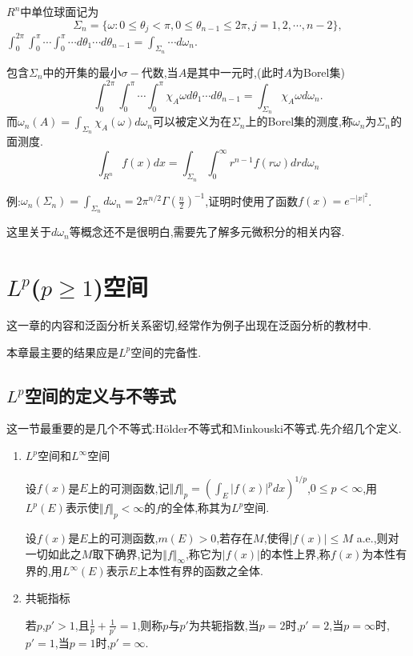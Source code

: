 \documentclass[12pt,a4paper,openany]{book}
\begin{document}
\begin{enumerate}
$R^n$中单位球面记为
\[
\Sigma_n = \{\omega:0 \le \theta_j < \pi,0 \le \theta_{n-1} \le 2\pi,j=1,2,\cdots,n-2\},
\]
$\int_{0}^{2\pi}\int_{0}^{\pi}\cdots\int_{0}^{\pi}{\cdots d{\theta_1}\cdots d{\theta_{n-1}}}=\int_{\Sigma_n}{\cdots d\omega_n}$.

包含$\Sigma_n$中的开集的最小$\sigma-$代数,当$A$是其中一元时,(此时$A$为Borel集)
\[
\int_{0}^{2\pi}\int_{0}^{\pi}\cdots\int_{0}^{\pi}{\chi_{A}{\omega} d{\theta_1}\cdots d{\theta_{n-1}}}=\int_{\Sigma_n}{\chi_{A}{\omega} d\omega_n}.
\]
而$\omega_n(A) = \int_{\Sigma_n}{\chi_{A}(\omega)d\omega_n}$可以被定义为在$\Sigma_n$上的Borel集的测度,称$\omega_n$为$\Sigma_n$的面测度.
\[
\int_{R^n}{f(x)dx}=\int_{\Sigma_n}{\int_{0}^{\infty}{r^{n-1}f(r\omega)drd\omega_n}}
\]

例:$\omega_n(\Sigma_n)=\int_{\Sigma_n}{d\omega_n} = 2\pi^{n/2}\Gamma(\frac{n}{2})^{-1}$,证明时使用了函数$f(x)=e^{-|x|^2}$.

这里关于$d\omega_n$等概念还不是很明白,需要先了解多元微积分的相关内容.

\end{enumerate}

\chapter{$L^p$($p \ge 1$)空间}
这一章的内容和泛函分析关系密切,经常作为例子出现在泛函分析的教材中.

本章最主要的结果应是$L^p$空间的完备性.

\section{$L^p$空间的定义与不等式}
这一节最重要的是几个不等式:H\"older不等式和Minkouski不等式.先介绍几个定义.

\begin{enumerate}
\item $L^p$空间和$L^{\infty}$空间

设$f(x)$是$E$上的可测函数,记$\Vert{f}\Vert_p = (\int_{E}{|f(x)|^pdx})^{1/p}$,$0 \le p < \infty$,用$L^p(E)$表示使$\Vert{f}\Vert_p<\infty$的$f$的全体,称其为$L^p$空间.

设$f(x)$是$E$上的可测函数,$m(E)>0$,若存在$M$,使得$|f(x)| \le M$ a.e.,则对一切如此之$M$取下确界,记为$\Vert{f}\Vert_{\infty}$,称它为$|f(x)|$的本性上界,称$f(x)$为本性有界的,用$L^{\infty}(E)$表示$E$上本性有界的函数之全体.

\item 共轭指标

若$p$,$p'>1$,且$\frac{1}{p} + \frac{1}{p'} = 1$,则称$p$与$p'$为共轭指数,当$p=2$时,$p'=2$,当$p=\infty$时,$p'=1$,当$p=1$时,$p'=\infty$.
\end{enumerate}
\end{document}
